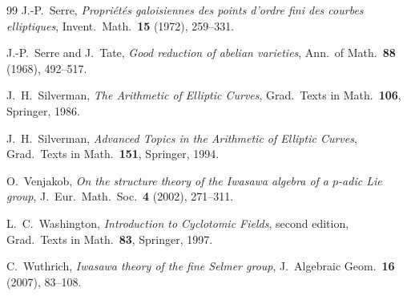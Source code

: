 \documentclass[11pt]{article}
\theoremstyle{definition}
\theoremstyle{remark}
\begin{document}
\begin{thebibliography}{99}
J.-P.~Serre,
\emph{Propri\'et\'es galoisiennes des points d'ordre fini des courbes elliptiques},
Invent.\ Math.\ \textbf{15} (1972), 259--331.

J.-P.~Serre and J.~Tate,
\emph{Good reduction of abelian varieties},
Ann.\ of Math.\ \textbf{88} (1968), 492--517.

J.~H.~Silverman,
\emph{The Arithmetic of Elliptic Curves},
Grad.\ Texts in Math.\ \textbf{106}, Springer, 1986.

J.~H.~Silverman,
\emph{Advanced Topics in the Arithmetic of Elliptic Curves},
Grad.\ Texts in Math.\ \textbf{151}, Springer, 1994.

O.~Venjakob,
\emph{On the structure theory of the Iwasawa algebra of a \(p\)-adic Lie group},
J.\ Eur.\ Math.\ Soc.\ \textbf{4} (2002), 271--311.

L.~C.~Washington,
\emph{Introduction to Cyclotomic Fields},
second edition, Grad.\ Texts in Math.\ \textbf{83}, Springer, 1997.

C.~Wuthrich,
\emph{Iwasawa theory of the fine Selmer group},
J.\ Algebraic Geom.\ \textbf{16} (2007), 83--108.

\end{thebibliography}
\end{document}
